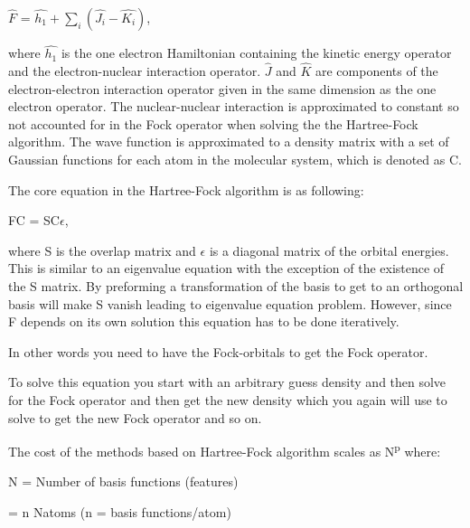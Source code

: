 \documentclass[twoside]{article}
\begin{document}
$\hat{F}$ = $\hat{h_1} + \sum\limits_{i}(\hat{J_i} - \hat{K_i})$,

where $\hat{h_1}$ is the one electron Hamiltonian containing the kinetic energy operator and the electron-nuclear interaction operator. $\hat{J}$ and $\hat{K}$ are components of the electron-electron interaction operator given in the same dimension as the one electron operator. The nuclear-nuclear interaction is approximated to constant so not accounted for in the Fock operator when solving 
the the Hartree-Fock algorithm. The wave function is approximated to a density matrix with a set of Gaussian functions for each atom in the molecular system, which is denoted as C. 


The core equation in the Hartree-Fock algorithm is as following:




FC = SC$\epsilon$,

where S is the overlap matrix and $\epsilon$ is a diagonal matrix of the orbital energies. This is similar to an eigenvalue equation with the exception of the existence of the S matrix. By preforming a transformation of the basis to get to an orthogonal basis will make S vanish leading to eigenvalue equation problem. However, since F depends on its own solution this equation has to be done iteratively. 

In other words you need to have the Fock-orbitals to get the Fock operator. 

To solve this equation you start with an arbitrary guess density and then solve for the Fock operator and then get the new density which you again will use to solve to get the new Fock operator and so on. 

The cost of the methods based on Hartree-Fock algorithm scales as N\textsuperscript{p} where: 

N = Number of basis functions (features) 

= n Natoms  (n = basis functions/atom)  
\end{document}
